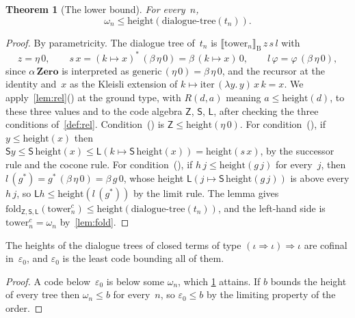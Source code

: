 \documentclass[11pt]{amsart}
\makeatletter
\newcommand{\Dial}{\mathrm{B}}
\newcommand{\gr}{\iota}                      %
\newcommand{\arr}{\Rightarrow}
\newcommand{\dsem}[1]{\llbracket #1 \rrbracket_{\Dial}}
\newcommand{\dtree}{\mathrm{dialogue\text{-}tree}}
\newcommand{\height}{\mathrm{height}}
\newcommand{\kext}[1]{#1^{*}}                %
\newcommand{\iterop}{\mathrm{iter}}
\newcommand{\Zeroc}{\mathbf{Zero}}
\newcommand{\bZ}{\mathsf{Z}}
\newcommand{\bS}{\mathsf{S}}
\newcommand{\bL}{\mathsf{L}}
\newcommand{\eps}{\varepsilon_{0}}
\newcommand{\tower}[1]{\omega_{#1}}           %
\newif\ifagdarefs
\newcommand{\AgdaRefs}[1]{\ifagdarefs{\footnotesize\color{agdablue}(#1)}\else\unskip\fi}
\newcommand{\Agda}[2]{{\footnotesize\color{agdablue}\textsf{#1}%
  \ifblank{#2}{}{\texttt{.}\allowbreak\texttt{#2}}}}
\let\ttt@plain\texttt
\renewcommand{\texttt}[1]{{\footnotesize\color{agdablue}\ttt@plain{#1}}}
\theoremstyle{plain}
\newtheorem{theorem}{Theorem}[section]
\theoremstyle{definition}
\makeatother
\begin{document}
\begin{theorem}[The lower bound]
\label{thm:lower}
For every~$n$,
\[
  \tower n \le \height(\dtree(t_{n})) .
\]
\AgdaRefs{\Agda{DialogueTrees.Sharpness}{tower-attained};
\Agda{DialogueTrees.Main}{attained}.}
\end{theorem}

\begin{proof}
By parametricity. The dialogue tree of~$t_n$ is
$\dsem{\mathrm{tower}_n}\,z\,s\,l$ with
\[
  z = \eta\,0 , \qquad
  s\,x = \kext{(k \mapsto x)}\,(\beta\,\eta\,0)
       = \beta\,(k \mapsto x)\,0 , \qquad
  l\,\varphi = \varphi\,(\beta\,\eta\,0) ,
\]
since $\alpha\,\Zeroc$ is interpreted as
$\mathrm{generic}\,(\eta\,0) = \beta\,\eta\,0$, and the recursor at the
identity and~$x$ as the Kleisli extension of
$k \mapsto \iterop\,(\lambda y.\,y)\,x\,k = x$. We
apply~\cref{lem:rel}() at the ground type,
with $R(d, a)$ meaning $a \le \height(d)$, to these three values and
to the code algebra $\bZ$, $\bS$, $\bL$, after checking the three
conditions of~\cref{def:rel}.
Condition~() is $\bZ \le \height(\eta\,0)$. For
condition~(), if $y \le \height(x)$ then
$\bS y \le \bS\,\height(x) \le \bL(k \mapsto \bS\,\height(x))
 = \height(s\,x)$, by the successor rule and the cocone rule. For
condition~(), if $h\,j \le \height(g\,j)$ for
every~$j$, then
$l\,(\kext g) = \kext g\,(\beta\,\eta\,0) = \beta\,g\,0$, whose height
$\bL(j \mapsto \bS\,\height(g\,j))$ is above every $h\,j$, so
$\bL h \le \height(l\,(\kext g))$ by the limit rule. The lemma gives
$\mathrm{fold}_{\bZ,\bS,\bL}(\mathrm{tower}^{c}_n) \le
\height(\dtree(t_n))$, and the left-hand side is
$\mathrm{tower}^{c}_n = \tower n$ by~\cref{lem:fold}.
\end{proof}

\begin{corollary}
\label{cor:least}
The heights of the dialogue trees of closed terms of type
$(\gr\arr\gr)\arr\gr$ are cofinal in~$\eps$, and $\eps$ is the least
code bounding all of them.
\AgdaRefs{\Agda{DialogueTrees.Sharpness}{heights-cofinal};
\texttt{ε₀-least}, \texttt{tower-term-below-ε₀};
\Agda{DialogueTrees.Main}{cofinal}, \texttt{least}.}
\end{corollary}

\begin{proof}
A code below~$\eps$ is below some $\tower n$, which
\cref{thm:lower} attains. If $b$ bounds the height of every tree then
$\tower n \le b$ for every~$n$, so $\eps \le b$ by the limiting
property of the order.
\end{proof}
\end{document}
